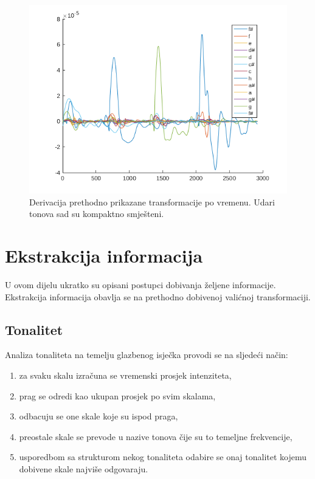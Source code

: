 \documentclass[a4paper, 11pt, twocolumn]{article}
\begin{document}
\begin{figure}[htb]
  \includegraphics[width=\linewidth]{adsr_der}
  \caption{Derivacija prethodno prikazane transformacije po vremenu. Udari tonova sad su kompaktno smješteni.}
  \label{fig:adsr_der}
\end{figure}

\section{Ekstrakcija informacija}
U ovom dijelu ukratko su opisani postupci dobivanja željene informacije.
Ekstrakcija informacija obavlja se na prethodno dobivenoj valićnoj transformaciji.

\subsection{Tonalitet}
Analiza tonaliteta na temelju glazbenog isječka provodi se na sljedeći način:
\begin{enumerate}
  \item za svaku skalu izračuna se vremenski prosjek intenziteta,
  \item prag se odredi kao ukupan prosjek po svim skalama,
  \item odbacuju se one skale koje su ispod praga,
  \item preostale skale se prevode u nazive tonova čije su to temeljne frekvencije,
  \item usporedbom sa strukturom nekog tonaliteta odabire se onaj tonalitet kojemu dobivene skale najviše odgovaraju.
\end{enumerate}
\end{document}
